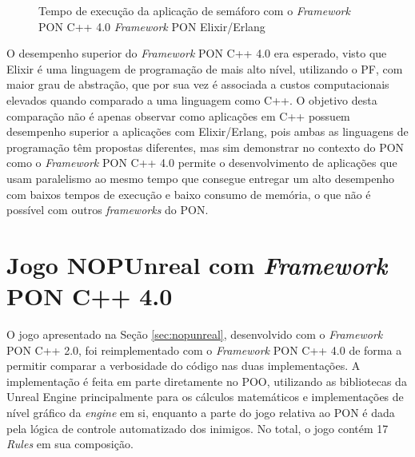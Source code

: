 \begin{figure}[!htb]
\centering
{}
\caption{Tempo de execução da aplicação de semáforo com o \textit{Framework}
PON C++ 4.0 \textit{Framework} PON Elixir/Erlang}
\label{fig:fw4_elixir}
\end{figure}

O desempenho superior do \textit{Framework} PON C++ 4.0 era esperado, visto que
Elixir é uma linguagem de programação de mais alto nível, utilizando o PF, com
maior grau de abstração, que por sua vez é associada a custos computacionais
elevados quando comparado a uma linguagem como C++. O objetivo desta comparação
não é apenas observar como aplicações em C++ possuem desempenho superior a
aplicações com Elixir/Erlang, pois ambas as linguagens de programação têm
propostas diferentes, mas sim demonstrar no contexto do PON como o
\textit{Framework} PON C++ 4.0 permite o desenvolvimento de aplicações que usam
paralelismo ao mesmo tempo que consegue entregar um alto desempenho com baixos
tempos de execução e baixo consumo de memória, o que não é possível com outros
\textit{frameworks} do PON.

\section{Jogo NOPUnreal com \textit{Framework} PON C++
4.0}\label{sec:nopunreal4}

O jogo apresentado na Seção \ref{sec:nopunreal}, desenvolvido com o
\textit{Framework} PON C++ 2.0, foi reimplementado com o \textit{Framework} PON
C++ 4.0 de forma a permitir comparar a verbosidade do código nas duas
implementações. A implementação é feita em parte diretamente no POO, utilizando
as bibliotecas da Unreal Engine principalmente para os cálculos matemáticos e
implementações de nível gráfico da \textit{engine} em si, enquanto a parte do
jogo relativa ao PON é dada pela lógica de controle automatizado dos inimigos.
No total, o jogo contém 17 \textit{Rules} em sua composição.


